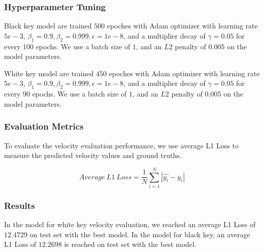 \documentclass[10pt,twocolumn,letterpaper]{article}
\begin{document}
\subsubsection{Hyperparameter Tuning}

Black key model are trained \(500\) epoches with Adam optimizer with learning rate \(5e-3\), \(\beta_1 = 0.9, \beta_2 = 0.999, \epsilon = 1e-8\), and a multiplier decay of \(\gamma=0.05\) for every $100$ epochs. We use a batch size of \(1\), and an \(L2\) penalty of \(0.005\) on the model parameters.

White key model are trained \(450\) epoches with Adam optimizer with learning rate \(5e-3\), \(\beta_1 = 0.9, \beta_2 = 0.999, \epsilon = 1e-8\), and a multiplier decay of \(\gamma=0.05\) for every $90$ epochs. We use a batch size of \(1\), and an \(L2\) penalty of \(0.005\) on the model parameters. 

\subsubsection{Evaluation Metrics}

To evaluate the velocity evaluation performance, we use average L1 Loss to measure the predicted velocity values and ground truths.

\[Average\ L1\ Loss = \frac{1}{N}\sum_{i=1}^{N}|\widehat{y_i} - y_i|\]

\subsubsection{Results}

In the model for white key velocity evaluation, we reached an average L1 Loss of \(12.4729\) on test set with the best model. In the model for black key, an average L1 Loss of \(12.2698\) is reached on test set with the best model.
\end{document}
